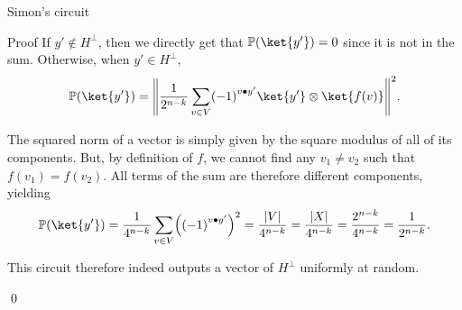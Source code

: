 \documentclass[a4paper]{article}
\begin{document}
\begin{parag}{Simon's circuit}
\begin{subparag}{Proof}
        If $y' \not \in H^{\perp}$, then we directly get that $\prob\left(\ket{y'}\right) = 0$ since it is not in the sum. Otherwise, when $y' \in H^{\perp}$,
        \[\prob\left(\ket{y'}\right) = \left\|\frac{1}{2^{n-k}} \sum_{v \in V} \left(-1\right)^{v \dotprod y'} \ket{y'} \otimes \ket{f\left(v\right)}\right\|^2.\]

        The squared norm of a vector is simply given by the square modulus of all of its components. But, by definition of $f$, we cannot find any $v_1 \neq v_2$ such that $f\left(v_1\right) = f\left(v_2\right)$. All terms of the sum are therefore different components, yielding 
        \[\prob\left(\ket{y'}\right) = \frac{1}{4^{n-k}} \sum_{v \in V} \left(\left(-1\right)^{v \dotprod y'}\right)^2 = \frac{\left|V\right|}{4^{n-k}} = \frac{\left|X\right|}{4^{n-k}} = \frac{2^{n-k}}{4^{n-k}} = \frac{1}{2^{n-k}}.\]


        This circuit therefore indeed outputs a vector of $H^{\perp}$ uniformly at random.

        \qed
    \end{subparag}
\end{parag}
\end{document}
